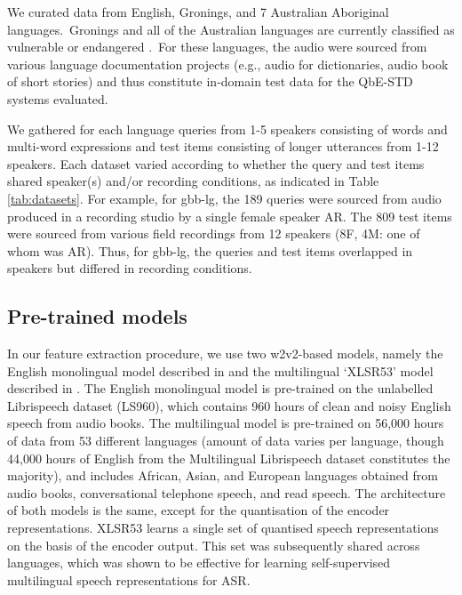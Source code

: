 \documentclass[main.tex]{subfiles}
\begin{document}
We curated data from English, Gronings, and 7 Australian Aboriginal languages.~Gronings and all of the Australian languages are currently classified as vulnerable or endangered \parencite{eberhard_ethnologue_2020}.~For these languages, the audio were sourced from various language documentation projects (e.g., audio for dictionaries, audio book of short stories) and thus constitute in-domain test data for the QbE-STD systems evaluated.

We gathered for each language queries from 1-5 speakers consisting of words and multi-word expressions and test items consisting of longer utterances from 1-12 speakers.
Each dataset varied according to whether the query and test items shared speaker(s) and/or recording conditions, as indicated in Table \ref{tab:datasets}.
For example, for gbb-lg, the 189 queries were sourced from audio produced in a recording studio by a single female speaker AR.
The 809 test items were sourced from various field recordings from 12 speakers (8F, 4M: one of whom was AR).
Thus, for gbb-lg, the queries and test items overlapped in speakers but differed in recording conditions.

\subsection{Pre-trained models}

In our feature extraction procedure, we use two w2v2-based models, namely the English monolingual model described in \textcite{NEURIPS2020_92d1e1eb} and the multilingual `XLSR53' model described in \textcite{conneau21_interspeech}.
The English monolingual model is pre-trained on the unlabelled Librispeech dataset (LS960), which contains 960 hours of clean and noisy English speech from audio books.
The multilingual model is pre-trained on 56,000 hours of data from 53 different languages (amount of data varies per language, though 44,000 hours of English from the Multilingual Librispeech dataset constitutes the majority), and includes African, Asian, and European languages obtained from audio books, conversational telephone speech, and read speech.
The architecture of both models is the same, except for the quantisation of the encoder representations.
XLSR53 learns a single set of quantised speech representations on the basis of the encoder output.
This set was subsequently shared across languages, which was shown to be effective for learning self-supervised multilingual speech representations for ASR.
\end{document}
